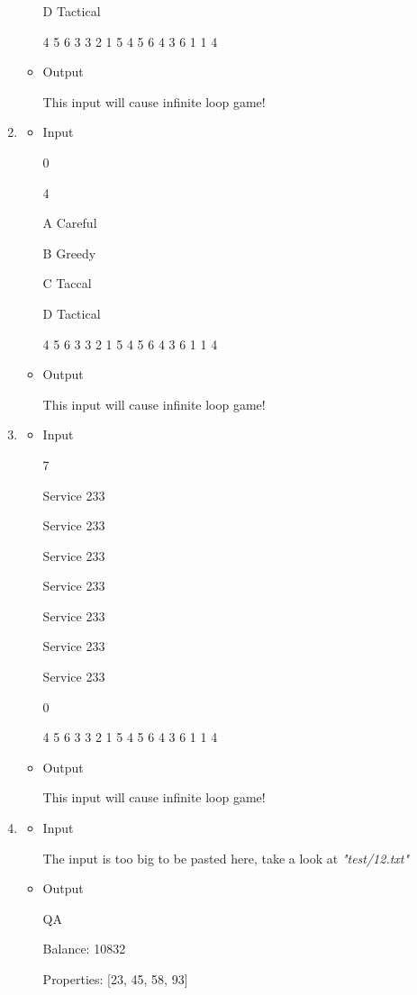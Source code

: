 \documentclass[a4paper, 12pt]{report}
\begin{document}
\begin{enumerate}
\begin{itemize}
D Tactical

4 5 6 3 3 2 1 5 4 5 6 4 3 6 1 1 4

		\item Output
		
This input will cause infinite loop game!
	
	\end{itemize}
\item
	\begin{itemize}
		\item Input
		
0

4

A Careful

B Greedy

C Taccal

D Tactical

4 5 6 3 3 2 1 5 4 5 6 4 3 6 1 1 4

		\item Output
		
This input will cause infinite loop game!

	\end{itemize}
\item
	\begin{itemize}
		\item Input
		
7

Service 233

Service 233

Service 233

Service 233

Service 233

Service 233

Service 233

0

4 5 6 3 3 2 1 5 4 5 6 4 3 6 1 1 4

		\item Output
		
This input will cause infinite loop game!

	\end{itemize}
\item
	\begin{itemize}
		\item Input
			
			The input is too big to be pasted here, take a look at \textit{"test/12.txt"}
		\item Output
			
QA

Balance: 10832

Properties: [23, 45, 58, 93]
	\end{itemize}
\end{enumerate}
\end{document}
